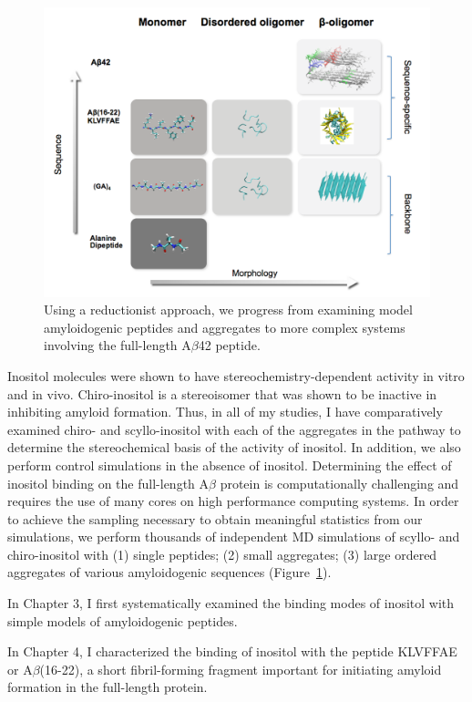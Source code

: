 \begin{figure}
\centering
\includegraphics[width=6in]{figures/introduction/matrix.pdf}
\caption[Thesis Rationale]{Using a reductionist approach, we progress from examining model amyloidogenic peptides and aggregates to more complex systems involving the full-length A$\beta$42 peptide.}
\label{fig:rationale}
\end{figure}

Inositol molecules were shown to have stereochemistry-dependent activity in vitro and in vivo. Chiro-inositol is a stereoisomer that was shown to be inactive in inhibiting amyloid formation. Thus, in all of my studies, I have comparatively examined chiro- and scyllo-inositol with each of the aggregates in the pathway to determine the stereochemical basis of the activity of inositol. In addition, we also perform control simulations in the absence of inositol.   Determining the effect of inositol binding on the full-length A$\beta$ protein is computationally challenging and requires the use of many cores on high performance computing systems.  In order to achieve the sampling necessary to obtain meaningful statistics from our simulations, we perform thousands of independent MD simulations of  scyllo- and chiro-inositol with (1) single peptides; (2) small aggregates; (3) large ordered aggregates of various amyloidogenic sequences (Figure~\ref{fig:rationale}).

In Chapter 3, I first systematically examined the binding modes of inositol with simple models of amyloidogenic peptides.

In Chapter 4, I characterized the binding of inositol with the peptide KLVFFAE or A$\beta$(16-22), a short fibril-forming fragment important for initiating amyloid formation in the full-length protein.

